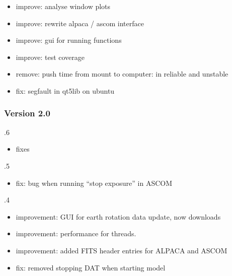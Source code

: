 \documentclass[a4paper,10pt,english]{sphinxmanual}
\begin{document}
\begin{itemize}
\item {} 
\sphinxAtStartPar
improve: analyse window plots

\item {} 
\sphinxAtStartPar
improve: rewrite alpaca / ascom interface

\item {} 
\sphinxAtStartPar
improve: gui for running functions

\item {} 
\sphinxAtStartPar
improve: test coverage

\item {} 
\sphinxAtStartPar
remove: push time from mount to computer: in reliable and unstable

\item {} 
\sphinxAtStartPar
fix: segfault in qt5lib on ubuntu

\end{itemize}


\subsubsection{Version 2.0}
\label{\detokenize{changelog/changelog:version-2-0}}
.6
\begin{itemize}
\item {} 
\sphinxAtStartPar
fixes

\end{itemize}

.5
\begin{itemize}
\item {} 
\sphinxAtStartPar
fix: bug when running “stop exposure” in ASCOM

\end{itemize}

.4
\begin{itemize}
\item {} 
\sphinxAtStartPar
improvement: GUI for earth rotation data update, now downloads

\item {} 
\sphinxAtStartPar
improvement: performance for threads.

\item {} 
\sphinxAtStartPar
improvement: added FITS header entries for ALPACA and ASCOM

\item {} 
\sphinxAtStartPar
fix: removed stopping DAT when starting model

\end{itemize}
\end{document}
